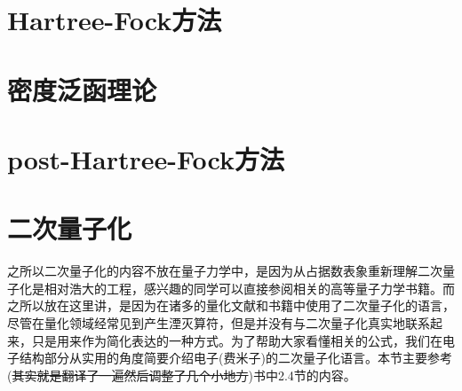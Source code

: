 \documentclass[12pt,a4paper,openany,twoside]{book}
\numberwithin{equation}{section}
\begin{document}
  \section{Hartree-Fock方法}
  \section{密度泛函理论}
  \section{post-Hartree-Fock方法}
  \section{二次量子化}
  之所以二次量子化的内容不放在量子力学中，是因为从占据数表象重新理解二次量子化是相对浩大的工程，感兴趣的同学可以直接参阅相关的高等量子力学书籍。而之所以放在这里讲，是因为在诸多的量化文献和书籍中使用了二次量子化的语言，尽管在量化领域经常见到产生湮灭算符，但是并没有与二次量子化真实地联系起来，只是用来作为简化表达的一种方式。为了帮助大家看懂相关的公式，我们在电子结构部分从实用的角度简要介绍电子(费米子)的二次量子化语言。本节主要参考(\sout{其实就是翻译了一遍然后调整了几个小地方})\cite{Szabo1989Modern}书中2.4节的内容。
\end{document}
